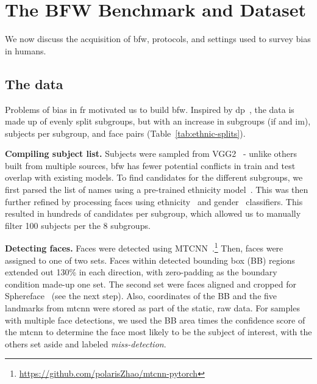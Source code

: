 \section{The BFW Benchmark and Dataset}
We now discuss the acquisition of \gls{bfw}, protocols, and settings used to survey bias in humans.

\subsection{The data}
Problems of bias in \gls{fr} motivated us to build \gls{bfw}. Inspired by \gls{dp}~\cite{demogPairs}, the data is made up of evenly split subgroups, but with an increase in subgroups (\ie \gls{if} and \gls{im}), subjects per subgroup, and face pairs (Table~\ref{tab:ethnic-splits}). 




\vspace{.5mm}
\noindent\textbf{Compiling subject list.} 
Subjects were sampled from VGG2~\cite{Cao18} - unlike others built from multiple sources, \gls{bfw} has fewer potential conflicts in train and test overlap with existing models. To find candidates for the different subgroups, we first parsed the list of names using a pre-trained ethnicity model~\cite{ambekar2009name}. This was then further refined by processing faces using ethnicity~\cite{fu2014learning} and gender~\cite{levi2015age} classifiers. This resulted in hundreds of candidates per subgroup, which allowed us to manually filter 100 subjects per the 8 subgroups.



\vspace{.5mm}
\noindent\textbf{Detecting faces.} Faces were detected using MTCNN~\cite{zhang2016joint}.\footnote{\href{https://github.com/polarisZhao/mtcnn-pytorch}{https://github.com/polarisZhao/mtcnn-pytorch}} Then, faces were assigned to one of two sets. Faces within detected bounding box (BB) regions extended out 130\% in each direction, with zero-padding as the boundary condition made-up one set. The second set were faces aligned and cropped for Sphereface~\cite{liu2017sphereface} (see the next step). Also, coordinates of the BB and the five landmarks from \gls{mtcnn} were stored as part of the static, raw data. For samples with multiple face detections, we used the BB area times the confidence score of the \gls{mtcnn} to determine the face most likely to be the subject of interest, with the others set aside and labeled \textit{miss-detection}. 



